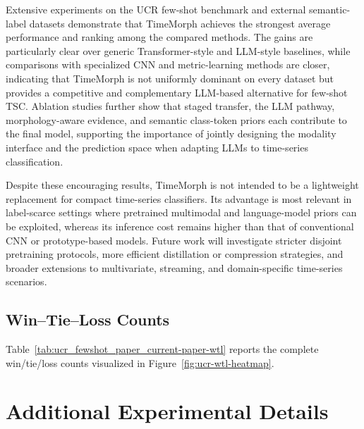 \documentclass[10pt,journal,compsoc]{IEEEtran}
\begin{document}
Extensive experiments on the UCR few-shot benchmark and external semantic-label datasets demonstrate that TimeMorph achieves the strongest average performance and ranking among the compared methods.
The gains are particularly clear over generic Transformer-style and LLM-style baselines, while comparisons with specialized CNN and metric-learning methods are closer, indicating that TimeMorph is not uniformly dominant on every dataset but provides a competitive and complementary LLM-based alternative for few-shot TSC.
Ablation studies further show that staged transfer, the LLM pathway, morphology-aware evidence, and semantic class-token priors each contribute to the final model, supporting the importance of jointly designing the modality interface and the prediction space when adapting LLMs to time-series classification.

Despite these encouraging results, TimeMorph is not intended to be a lightweight replacement for compact time-series classifiers.
Its advantage is most relevant in label-scarce settings where pretrained multimodal and language-model priors can be exploited, whereas its inference cost remains higher than that of conventional CNN or prototype-based models.
Future work will investigate stricter disjoint pretraining protocols, more efficient distillation or compression strategies, and broader extensions to multivariate, streaming, and domain-specific time-series scenarios.


\clearpage
\onecolumn
\appendices


\clearpage

\clearpage

\clearpage


\clearpage

\subsection{Win--Tie--Loss Counts}
\label{app:wtl-table}
Table~\ref{tab:ucr_fewshot_paper_current-paper-wtl} reports the complete win/tie/loss counts visualized in Figure~\ref{fig:ucr-wtl-heatmap}.



\clearpage

\section{Additional Experimental Details}
\label{app:details}
\end{document}

